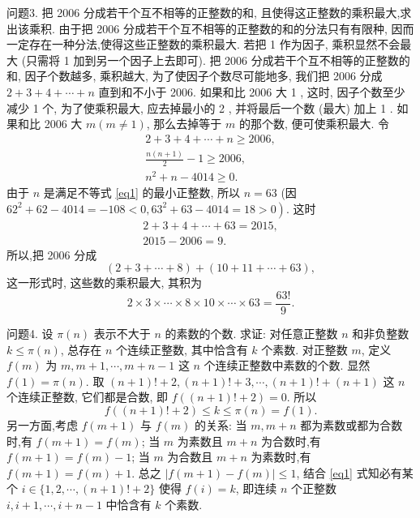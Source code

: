 问题3. 把 2006 分成若干个互不相等的正整数的和, 且使得这正整数的乘积最大,求出该乘积.
由于把 2006 分成若干个互不相等的正整数的和的分法只有有限种, 因而一定存在一种分法,使得这些正整数的乘积最大.
若把 1 作为因子, 乘积显然不会最大 (只需将 1 加到另一个因子上去即可). 把 2006 分成若干个互不相等的正整数的和, 因子个数越多, 乘积越大, 为了使因子个数尽可能地多, 我们把 2006 分成 $2+3+4+\cdots+n$ 直到和不小于 2006.
如果和比 2006 大 1 , 这时, 因子个数至少减少 1 个, 为了使乘积最大, 应去掉最小的 2 , 并将最后一个数 (最大) 加上 1 .
如果和比 2006 大 $m(m \neq 1)$, 那么去掉等于 $m$ 的那个数, 便可使乘积最大.
令
$$
\begin{gathered}
2+3+4+\cdots+n \geqslant 2006, \\
\frac{n(n+1)}{2}-1 \geqslant 2006, \\
n^2+n-4014 \geqslant 0 . \label{eq1}
\end{gathered}
$$
由于 $n$ 是满足不等式 \ref{eq1} 的最小正整数, 所以 $n=63$ (因 $62^2+62-4014= \left.-108<0,63^2+63-4014=18>0\right)$. 这时
$$
\begin{gathered}
2+3+4+\cdots+63=2015, \\
2015-2006=9 .
\end{gathered}
$$
所以,把 2006 分成
$$
(2+3+\cdots+8)+(10+11+\cdots+63),
$$
这一形式时, 这些数的乘积最大, 其积为
$$
2 \times 3 \times \cdots \times 8 \times 10 \times \cdots \times 63=\frac{63 !}{9} .
$$



问题4. 设 $\pi(n)$ 表示不大于 $n$ 的素数的个数.
求证: 对任意正整数 $n$ 和非负整数 $k \leqslant \pi(n)$, 总存在 $n$ 个连续正整数, 其中恰含有 $k$ 个素数.
对正整数 $m$, 定义 $f(m)$ 为 $m, m+1, \cdots, m+n-1$ 这 $n$ 个连续正整数中素数的个数.
显然 $f(1)=\pi(n)$.
取 $(n+1) !+2,(n+1) !+3, \cdots,(n+1) !+(n+1)$ 这 $n$ 个连续正整数, 它们都是合数, 即 $f((n+1) !+2)=0$. 所以
$$
f((n+1) !+2) \leqslant k \leqslant \pi(n)=f(1) . \label{eq1}
$$
另一方面,考虑 $f(m+1)$ 与 $f(m)$ 的关系:
当 $m, m+n$ 都为素数或都为合数时,有 $f(m+1)=f(m)$;
当 $m$ 为素数且 $m+n$ 为合数时,有 $f(m+1)=f(m)-1$;
当 $m$ 为合数且 $m+n$ 为素数时,有 $f(m+1)=f(m)+1$.
总之 $|f(m+1)-f(m)| \leqslant 1$, 结合 \ref{eq1} 式知必有某个 $i \in\{1,2, \cdots,(n+1) !+2\}$ 使得 $f(i)=k$, 即连续 $n$ 个正整数 $i, i+1, \cdots, i+n-1$ 中恰含有 $k$ 个素数.




